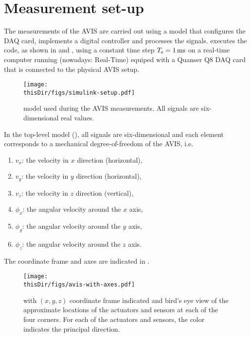
\section{ Measurement set-up}
\label{app:avis-setup}
The measurements of the \gls{AVIS} are carried out using a \Simulink model that configures the \gls{DAQ} card, implements a digital controller and processes the signals.
\Simulink executes the code, as shown in  and ,  using a constant time step $T_{\mathrm{s}} = 1\,\mathrm{ms}$ on a real-time computer running  (nowadays: \Simulink Real-Time) equiped with a Quanser Q8 \gls{DAQ} card that is connected to the physical \gls{AVIS} setup.

\begin{figure}
\setlength\figurewidth{\columnwidth}
  \texttt{[image: \\thisDir/figs/simulink-setup.pdf]}
  \caption[\Simulink model used on the ]{\Simulink model used during the AVIS measurements. All signals are six-dimensional real values.}
  \label{fig:avis:simulink:setup}
\end{figure}

In the top-level model (), all signals are six-dimensional and each element corresponds to a mechanical degree-of-freedom of the \gls{AVIS}, i.e. 
\begin{enumerate}
  \item $v_x$: the velocity in $x$ direction (horizontal),
  \item $v_y$: the velocity in $y$ direction (horizontal),
  \item $v_z$: the velocity in $z$ direction (vertical),
  \item $\phi_x$: the angular velocity around the $x$ axis,
  \item $\phi_y$: the angular velocity around the $y$ axis,
  \item $\phi_z$: the angular velocity around the $z$ axis.
\end{enumerate}
The coordinate frame and axes are indicated in .

\begin{figure}
  \centering
  \texttt{[image: \\thisDir/figs/avis-with-axes.pdf]}
  \caption[ with coordinate frame, sensors and actuators.]{ with $(x,y,z)$ coordinate frame indicated and bird's eye view of the approximate locations of the actuators and sensors at each of the four corners. For each of the actuators and sensors, the color indicates the principal direction.}
  \label{fig:avis:withAxes}
\end{figure}

